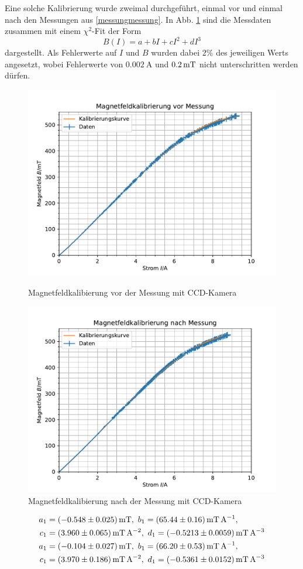 \documentclass{article}
\begin{document}
\begin{multicols}{2}
Eine solche Kalibrierung wurde zweimal durchgeführt, einmal vor und einmal nach den Messungen aus \ref{messungmessung}.
In Abb. \ref{fig:magnetkalib} sind die Messdaten zusammen mit einem $\chi^2$-Fit der Form
\[
  B(I) = a + bI + cI^2 + dI^3
\]
dargestellt. Als Fehlerwerte auf $I$ und $B$ wurden dabei $2\%$ des jeweiligen Werts angesetzt,
wobei Fehlerwerte von $\SI{0.002}{\A}$ und $\SI{0.2}{\mT}$ nicht unterschritten werden dürfen.

\begin{figure}[H]
  \centering
  \includegraphics[width=.8\linewidth]{magnetkalib}
  \caption{Magnetfeldkalibierung vor der Messung mit CCD-Kamera}
  \includegraphics[width=.8\linewidth]{magnetkalib2}
  \caption{Magnetfeldkalibierung nach der Messung mit CCD-Kamera}
  \label{fig:magnetkalib}
\end{figure}

\begin{align*}
  a_1&=\SI{-0.548 \pm 0.025}{\mT},\ b_1=\SI{65.44 \pm 0.16}{\mT\per\A}, \\
  c_1&=\SI{3.96 \pm 0.065}{\mT\per\A\squared},\ d_1=\SI{-0.5213 \pm 0.0059}{\mT\per\A\cubed} \\
  a_1&=\SI{-0.104 \pm 0.027}{\mT},\ b_1=\SI{66.20 \pm 0.53}{\mT\per\A}, \\
  c_1&=\SI{3.97 \pm 0.186}{\mT\per\A\squared},\ d_1=\SI{-0.5361 \pm 0.0152}{\mT\per\A\cubed}
\end{align*}


\end{multicols}
\end{document}
